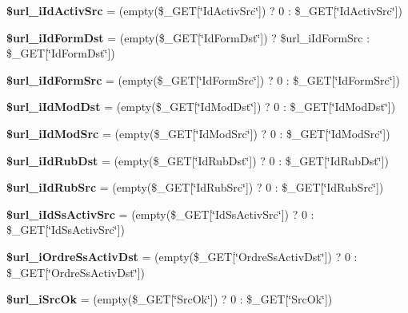 \begin{CompactItemize}
\item 
\textbf{\$url\_\-iIdActivSrc} = (empty(\$\_\-GET[\char`\"{}IdActivSrc\char`\"{}]) ? 0 : \$\_\-GET[\char`\"{}IdActivSrc\char`\"{}])\label{copie__ss__activ_8php_2476f217f96a9e2e79eceb4f136f2934}

\item 
\textbf{\$url\_\-iIdFormDst} = (empty(\$\_\-GET[\char`\"{}IdFormDst\char`\"{}]) ? \$url\_\-iIdFormSrc : \$\_\-GET[\char`\"{}IdFormDst\char`\"{}])\label{copie__ss__activ_8php_567046dac06231cd778843179645aac5}

\item 
\textbf{\$url\_\-iIdFormSrc} = (empty(\$\_\-GET[\char`\"{}IdFormSrc\char`\"{}]) ? 0 : \$\_\-GET[\char`\"{}IdFormSrc\char`\"{}])\label{copie__ss__activ_8php_7d23b6d8e8be4b72aec972efac946e63}

\item 
\textbf{\$url\_\-iIdModDst} = (empty(\$\_\-GET[\char`\"{}IdModDst\char`\"{}]) ? 0 : \$\_\-GET[\char`\"{}IdModDst\char`\"{}])\label{copie__ss__activ_8php_c41023b63574a7d174a663b4d124b1bc}

\item 
\textbf{\$url\_\-iIdModSrc} = (empty(\$\_\-GET[\char`\"{}IdModSrc\char`\"{}]) ? 0 : \$\_\-GET[\char`\"{}IdModSrc\char`\"{}])\label{copie__ss__activ_8php_404de3ff18f4725fee13ab25d228dfd4}

\item 
\textbf{\$url\_\-iIdRubDst} = (empty(\$\_\-GET[\char`\"{}IdRubDst\char`\"{}]) ? 0 : \$\_\-GET[\char`\"{}IdRubDst\char`\"{}])\label{copie__ss__activ_8php_d38b2dba1867600ceebb02443bbd894d}

\item 
\textbf{\$url\_\-iIdRubSrc} = (empty(\$\_\-GET[\char`\"{}IdRubSrc\char`\"{}]) ? 0 : \$\_\-GET[\char`\"{}IdRubSrc\char`\"{}])\label{copie__ss__activ_8php_6f4b968c61928c1ec368acd93e89f7ef}

\item 
\textbf{\$url\_\-iIdSsActivSrc} = (empty(\$\_\-GET[\char`\"{}IdSsActivSrc\char`\"{}]) ? 0 : \$\_\-GET[\char`\"{}IdSsActivSrc\char`\"{}])\label{copie__ss__activ_8php_19aee55e397ab5a4171ea068c1b40437}

\item 
\textbf{\$url\_\-iOrdreSsActivDst} = (empty(\$\_\-GET[\char`\"{}OrdreSsActivDst\char`\"{}]) ? 0 : \$\_\-GET[\char`\"{}OrdreSsActivDst\char`\"{}])\label{copie__ss__activ_8php_c918c6e3cdbaca7edb77d9c06920eda5}

\item 
\textbf{\$url\_\-iSrcOk} = (empty(\$\_\-GET[\char`\"{}SrcOk\char`\"{}]) ? 0 : \$\_\-GET[\char`\"{}SrcOk\char`\"{}])\label{copie__ss__activ_8php_b57149b16534096f0ca81cd8e78fa958}

\end{CompactItemize}



